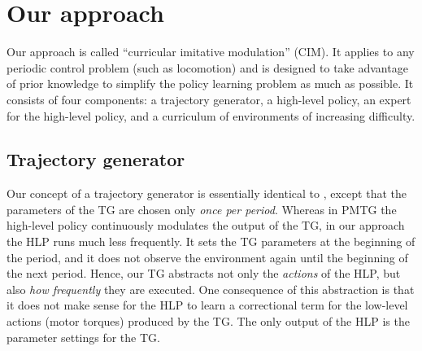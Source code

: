 \documentclass[conference]{IEEEtran}
\newcommand{\nhatch}[1]{{\leavevmode\color{magenta} Nathan: #1}}
\begin{document}
\section{Our approach} \label{sec:approach}

Our approach is called ``curricular imitative modulation'' (CIM).
It applies to any periodic control problem (such as locomotion) and is
designed to take advantage of prior knowledge to simplify the policy learning problem as much as possible.
It consists of four components: a trajectory generator, a high-level policy, an expert for the high-level policy, and a curriculum of environments of increasing difficulty.


\subsection{Trajectory generator} \label{sec:tg}

Our concept of a trajectory generator is essentially identical to \citet{iscen2018pmtg}, except that the parameters of the TG are chosen only \emph{once per period}.
Whereas in PMTG the high-level policy continuously modulates the output of the TG, in our approach the HLP runs much less frequently.
It sets the TG parameters at the beginning of the period, and it does not observe the environment again until the beginning of the next period.
Hence, our TG abstracts not only the \emph{actions} of the HLP, but also \emph{how frequently} they are executed.
One consequence of this abstraction is that it does not make sense for the HLP to learn a correctional term for the low-level actions (motor torques) produced by the TG.
The only output of the HLP is the parameter settings for the TG.
\end{document}
